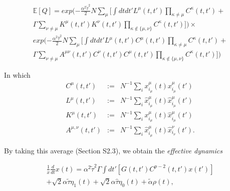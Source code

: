 \documentclass[sigconf,anonymous]{aamas}
\newcommand{\xmu}[2]{x_{#1_#2}^{#2}(t)}
\newcommand{\xmudash}[2]{x_{#1_#2}^{#2}(t')}
\newcommand{\hxmu}[1]{\hat{x}_{#1_\mu}^{\mu} (t)}
\newcommand{\hxmudash}[1]{\hat{x}_{#1_\mu}^{\mu} (t')}
\newcommand{\hxnudash}[1]{\hat{x}_{#1_\nu}^{\nu} (t')}
\newcommand{\talpha}{\tilde{\alpha}}
\newcommand{\ttau}{\tilde{\tau}}
\newcommand{\htau}{\hat{\tau}}
\begin{document}
\begin{equation}
\begin{split}
        \mathbb{E}[Q] = exp(- \frac{\alpha^2 \ttau ^2}{2} N \sum_{\mu} \Big [ \int dt dt' L^\mu(t, t') \prod_{\kappa \neq \mu} C^\kappa (t, t') + \\ \Gamma \sum_{\nu \neq \mu} K^\mu (t, t') K^\nu (t, t') \prod_{\kappa \not\in \{\mu, \nu\}} C^\kappa (t, t') \Big ] ) \times \\
        exp(- \frac{\alpha^2 \htau ^2}{2} N \sum_{\mu} \Big [ \int dt dt' L^\mu(t, t') C^\mu (t, t') \prod_{\kappa \neq \mu} C^\kappa (t, t') + \\ \Gamma \sum_{\nu \neq \mu} A^{\mu \nu} (t, t') C^\nu (t, t') C^\mu (t, t') \prod_{\kappa \not\in \{\mu, \nu\}} C^\kappa (t, t') \Big ] )
\end{split}
\end{equation}

In which
%
\begin{eqnarray*}
\label{eqn::correlations}
        C^\mu (t, t') &  := & N^{-1} \sum_i \xmu{i}{\mu} \xmudash{i}{\mu} \\
        L^\mu (t, t') & :=  & N^{-1} \sum_i \hxmu{i} \hxmudash{i} \\
        K^\mu (t, t') & :=  & N^{-1} \sum_i \xmu{i}{\mu} \hxmudash{i} \\
        A^{\mu, \nu} (t, t') & := &  N^{-1} \sum_i \hxmu{i} \hxnudash{i}.
\end{eqnarray*}

By taking this average (Section S2.3), we obtain the \textit{effective dynamics}

\begin{equation}
    \label{eqn::EffectiveDynamics}
    \begin{split}
            \frac{1}{x} \frac{d}{dt} x(t) = \alpha^2 \ttau^2 \Gamma \int dt' \left [G(t, t')C^{p - 2}(t, t') x(t') \right ]\\ + \sqrt{2} \alpha \ttau \eta_1(t) + \sqrt{2} \alpha \htau \eta_0(t) + \talpha \rho(t), 
    \end{split}
\end{equation}
\end{document}
